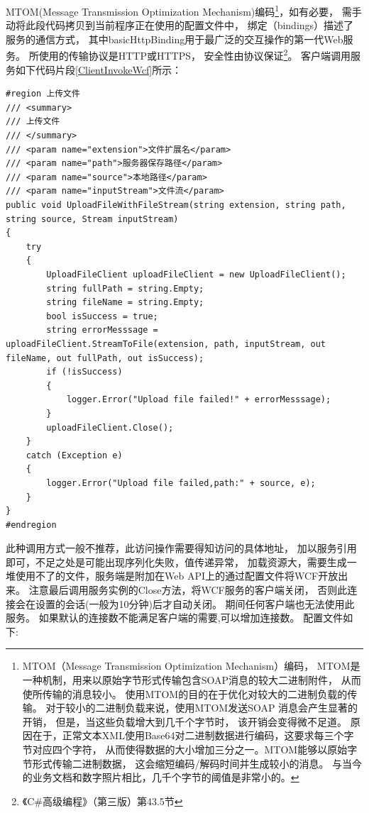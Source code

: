 \documentclass{book}
\begin{document}
MTOM(Message Transmission Optimization Mechanism)编码\footnote{MTOM（Message Transmission Optimization Mechanism）编码，
MTOM是一种机制，用来以原始字节形式传输包含SOAP消息的较大二进制附件，
从而使所传输的消息较小。
使用MTOM的目的在于优化对较大的二进制负载的传输。
对于较小的二进制负载来说，使用MTOM发送SOAP 消息会产生显著的开销，
但是，当这些负载增大到几千个字节时，
该开销会变得微不足道。
原因在于，正常文本XML使用Base64对二进制数据进行编码，这要求每三个字节对应四个字符，
从而使得数据的大小增加三分之一。MTOM能够以原始字节形式传输二进制数据，
这会缩短编码/解码时间并生成较小的消息。
与当今的业务文档和数字照片相比，几千个字节的阈值是非常小的。}，如有必要，
需手动将此段代码拷贝到当前程序正在使用的配置文件中，
绑定（bindings）描述了服务的通信方式，
其中basicHttpBinding用于最广泛的交互操作的第一代Web服务。
所使用的传输协议是HTTP或HTTPS，
安全性由协议保证\footnote{《C\#高级编程》（第三版）第43.5节}。
客户端调用服务如下代码片段\ref{ClientInvokeWcf}所示：

\begin{lstlisting}[language={[Sharp]C},caption=调用WCF接口上传文件,label=ClientInvokeWcf]
#region 上传文件
/// <summary>
/// 上传文件
/// </summary>
/// <param name="extension">文件扩展名</param>
/// <param name="path">服务器保存路径</param>
/// <param name="source">本地路径</param>
/// <param name="inputStream">文件流</param>
public void UploadFileWithFileStream(string extension, string path, string source, Stream inputStream)
{
    try
    {
        UploadFileClient uploadFileClient = new UploadFileClient();
        string fullPath = string.Empty;
        string fileName = string.Empty;
        bool isSuccess = true;
        string errorMesssage = uploadFileClient.StreamToFile(extension, path, inputStream, out fileName, out fullPath, out isSuccess);
        if (!isSuccess)
        {
            logger.Error("Upload file failed!" + errorMesssage);
        }
        uploadFileClient.Close();
    }
    catch (Exception e)
    {
        logger.Error("Upload file failed,path:" + source, e);
    }
}
#endregion
\end{lstlisting}

此种调用方式一般不推荐，此访问操作需要得知访问的具体地址，
加以服务引用即可，不足之处是可能出现序列化失败，值传递异常，
加载资源大，需要生成一堆使用不了的文件，服务端是附加在Web API上的通过配置文件将WCF开放出来。
注意最后调用服务实例的Close方法，将WCF服务的客户端关闭，
否则此连接会在设置的会话(一般为10分钟)后才自动关闭。
期间任何客户端也无法使用此服务。
如果默认的连接数不能满足客户端的需要,可以增加连接数。
配置文件如下:
\end{document}

